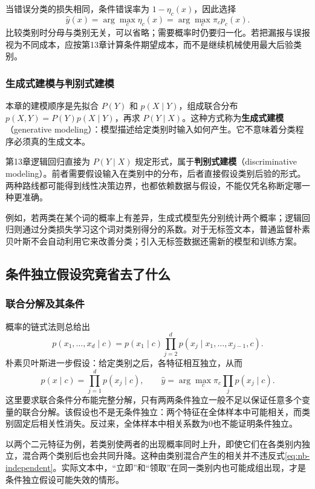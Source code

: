 \documentclass[UTF8,fontset=none,zihao=-4,a4paper]{ctexart}
\newcommand{\term}[1]{\textbf{#1}}
\numberwithin{equation}{section}
\numberwithin{figure}{section}
\begin{document}
当错误分类的损失相同，条件错误率为 $1-\eta_c(x)$，因此选择
\[
 \widehat y(x)=\arg\max_c\eta_c(x)
             =\arg\max_c\pi_c p_c(x).
\]
比较类别时分母与类别无关，可以省略；需要概率时仍要归一化。若把漏报与误报视为不同成本，应按第13章计算条件期望成本，而不是继续机械使用最大后验类别。

\subsubsection{生成式建模与判别式建模}
本章的建模顺序是先拟合 $P(Y)$ 和 $p(X\mid Y)$，组成联合分布 $p(X,Y)=P(Y)p(X\mid Y)$，再求 $P(Y\mid X)$。这种方式称为\term{生成式建模}（generative modeling）：模型描述给定类别时输入如何产生。它不意味着分类程序必须真的生成文本。

第13章逻辑回归直接为 $P(Y\mid X)$ 规定形式，属于\term{判别式建模}（discriminative modeling）。前者需要假设输入在类别中的分布，后者直接假设类别后验的形式。两种路线都可能得到线性决策边界，也都依赖数据与假设，不能仅凭名称断定哪一种更准确。

例如，若两类在某个词的概率上有差异，生成式模型先分别统计两个概率；逻辑回归则通过分类损失学习这个词对类别得分的系数。对于无标签文本，普通监督朴素贝叶斯不会自动利用它来改善分类；引入无标签数据还需新的模型和训练方案。

\subsection{条件独立假设究竟省去了什么}
\subsubsection{联合分解及其条件}
概率的链式法则总给出
\[
 p(x_1,\ldots,x_d\mid c)
 =p(x_1\mid c)\prod_{j=2}^d p(x_j\mid x_1,\ldots,x_{j-1},c).
\]
朴素贝叶斯进一步假设：给定类别之后，各特征相互独立，从而
\begin{equation}\label{eq:nb-independent}
 p(x\mid c)=\prod_{j=1}^d p(x_j\mid c),\qquad
 \widehat y=\arg\max_c \pi_c\prod_jp(x_j\mid c).
\end{equation}
这里要求联合条件分布能完整分解，只有两两条件独立一般不足以保证任意多个变量的联合分解。该假设也不是无条件独立：两个特征在全体样本中可能相关，而类别固定后相关性消失。反过来，全体样本中相关系数为0也不能证明条件独立。

以两个二元特征为例，若类别使两者的出现概率同时上升，即使它们在各类别内独立，混合两个类别后也会共同升降。这种由类别混合产生的相关并不违反式\eqref{eq:nb-independent}。实际文本中，“立即”和“领取”在同一类别内也可能成组出现，才是条件独立假设可能失效的情形。
\end{document}
